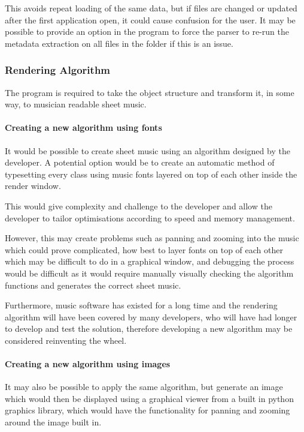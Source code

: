 This avoids repeat loading of the same data, but if files are changed or updated after the first application open, it could cause confusion for the user. It may be possible to provide an option in the program to force the parser to re-run the metadata extraction on all files in the folder if this is an issue.

\subsubsection{Rendering Algorithm}
The program is required to take the object structure and transform it, in some way, to musician readable sheet music. 

\paragraph{Creating a new algorithm using fonts}
It would be possible to create sheet music using an algorithm designed by the developer. A potential option would be to create an automatic method of typesetting every class using music fonts layered on top of each other inside the render window.

This would give complexity and challenge to the developer and allow the developer to tailor optimisations according to speed and memory management.

However, this may create problems such as panning and zooming into the music which could prove complicated, how best to layer fonts on top of each other which may be difficult to do in a graphical window, and debugging the process would be difficult as it would require manually visually checking the algorithm functions and generates the correct sheet music.

Furthermore, music software has existed for a long time and the rendering algorithm will have been covered by many developers, who will have had longer to develop and test the solution, therefore developing a new algorithm may be considered reinventing the wheel.

\paragraph{Creating a new algorithm using images}
It may also be possible to apply the same algorithm, but generate an image which would then be displayed using a graphical viewer from a built in python graphics library, which would have the functionality for panning and zooming around the image built in. 

